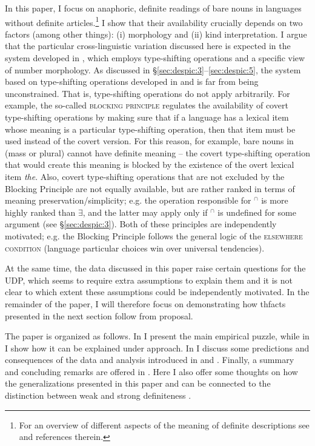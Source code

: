 \documentclass[output=paper,
modfonts
]{langscibook}
\begin{document}
	In this paper, I focus on anaphoric, definite readings of bare nouns in languages without definite articles.\footnote{For an overview of different aspects of the meaning of definite descriptions see \citet{Schwarz2009} and references
		therein.}  I show that their availability crucially depends on two factors (among other things): (i)  morphology and (ii) kind interpretation. I argue that the particular cross-linguistic variation discussed here is expected in the system developed in \citet{Dayal2004}, which employs type-shifting operations and a specific view of number morphology. 
	As discussed in \S\ref{sec:despic:3}--\ref{sec:despic:5}, the system based on type-shifting operations developed in \citet{Chierchia1998} and \citet{Dayal2004} is far from being unconstrained. That is, type-shifting operations do not apply arbitrarily. For example, the so-called \textsc{blocking principle} regulates the availability of covert type-shifting operations by making sure that if a language has a lexical item whose meaning is a particular type-shifting operation, then that item must be used instead of the covert version. For this reason, for example, bare nouns in  (mass or plural) cannot have definite meaning -- the covert type-shifting operation that would create this meaning is blocked by the existence of the overt lexical item \textit{the}. Also, covert type-shifting operations that are not excluded by the Blocking Principle are not equally available, but are rather ranked in terms of meaning preservation/simplicity; e.g. the operation responsible for  $^\cap$ is more highly ranked than $\exists$, and the latter may apply only if $^\cap$ is undefined for some argument (see \S\ref{sec:despic:3}). Both of these principles are independently motivated; e.g. the Blocking Principle follows the general logic of the \textsc{elsewhere condition} (language particular choices win over universal tendencies).  
	
	At the same time, the data discussed in this paper raise certain questions for the UDP, which seems to require extra assumptions to explain them and it is not clear to which extent these assumptions could be independently motivated. In the remainder of the paper, I will therefore focus on demonstrating how th\largerpage facts presented in the next section follow from  proposal. 
	
	The paper is organized as follows. In  I present the main empirical puzzle, while in  I show how it can be explained under  approach. In  I discuss some predictions and consequences of the data and analysis introduced in  and . Finally, a summary and concluding remarks are offered in .
	Here I also offer some thoughts on how the generalizations presented in this paper and \citet{Dayal2004} can be connected to the distinction between weak and strong definiteness \citep[e.g.][]{Schwarz2009}. 
	
\end{document}
